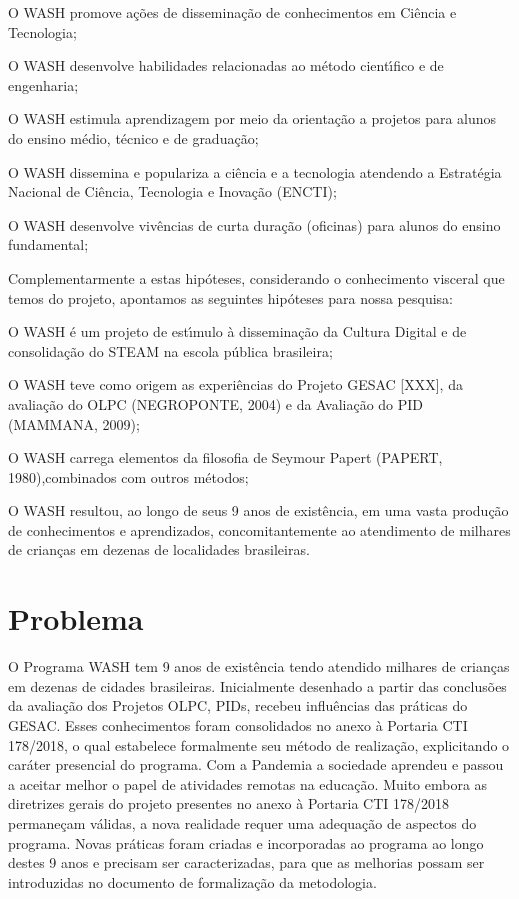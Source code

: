 \documentclass[
12pt,		%
openright,	%
twoside,  %
a4paper,			%
chapter=TITLE,		%
english,			%
french,				%
spanish,			%
brazil				%
]{USPSC-classe/USPSC}
\begin{document}
\begin{alineas}
\item O WASH promove a\c{c}\~oes de dissemina\c{c}\~ao de conhecimentos em Ci\^encia e Tecnologia;
\item O WASH desenvolve habilidades relacionadas ao m\'etodo cient\'{\i}fico e de engenharia;
\item O WASH estimula aprendizagem por meio da orienta\c{c}\~ao a projetos para alunos do ensino m\'edio, t\'ecnico e de gradua\c{c}\~ao;
\item O WASH dissemina e populariza a ci\^encia e a tecnologia atendendo a Estrat\'egia Nacional de Ci\^encia, Tecnologia e Inova\c{c}\~ao (ENCTI);
\item O WASH desenvolve viv\^encias de curta dura\c{c}\~ao (oficinas) para alunos do ensino fundamental;
\end{alineas}

Complementarmente a estas hip\'oteses, considerando o conhecimento visceral que temos do projeto, apontamos as seguintes hip\'oteses para nossa pesquisa:



\begin{alineas}
\item O WASH \'e um projeto de est\'{\i}mulo \`a dissemina\c{c}\~ao da Cultura Digital e de consolida\c{c}\~ao do STEAM na escola p\'ublica brasileira;
\item O WASH teve como origem as experi\^encias do Projeto GESAC [XXX], da avalia\c{c}\~ao do OLPC (NEGROPONTE, 2004) e da Avalia\c{c}\~ao do PID (MAMMANA, 2009);
\item O WASH carrega elementos da filosofia de Seymour Papert (PAPERT, 1980),combinados com outros m\'etodos;
\item O WASH resultou, ao longo de seus 9 anos de exist\^encia, em uma vasta produ\c{c}\~ao de conhecimentos e aprendizados, concomitantemente ao atendimento de milhares de crian\c{c}as em dezenas de localidades brasileiras.
\end{alineas}

\section[Problema]{Problema}\label{Problema}
O Programa WASH tem 9 anos de exist\^encia tendo atendido milhares de crian\c{c}as em dezenas de cidades brasileiras. Inicialmente desenhado a partir das conclus\~oes da avalia\c{c}\~ao dos Projetos OLPC, PIDs, recebeu influ\^encias das pr\'aticas do GESAC. Esses conhecimentos foram consolidados no anexo \`a Portaria CTI 178/2018, o qual estabelece formalmente seu m\'etodo de realiza\c{c}\~ao, explicitando o car\'ater presencial do programa. Com a Pandemia a sociedade aprendeu e passou a aceitar melhor o papel de atividades remotas na educa\c{c}\~ao. Muito embora as diretrizes gerais do projeto presentes no anexo \`a Portaria CTI 178/2018 permane\c{c}am v\'alidas, a nova realidade requer uma adequa\c{c}\~ao de aspectos do programa. Novas pr\'aticas foram criadas e incorporadas ao programa ao longo destes 9 anos e precisam ser caracterizadas, para que as melhorias possam ser introduzidas no documento de formaliza\c{c}\~ao da metodologia.
\end{document}
